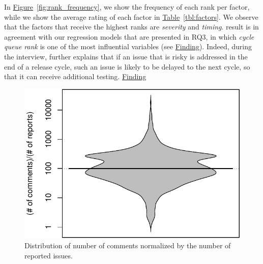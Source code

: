 \begin{sloppypar}
In \hyperref[fig:rank_frequency]{Figure}~\ref{fig:rank_frequency}, we show the
frequency of each rank per factor, while we show the average rating of each
factor in \hyperref[tbl:factors]{Table}~\ref{tbl:factors}. We observe that the
factors that receive the highest ranks are {\em severity} and {\em timing}.
\DIFdelbegin {}\DIFdelend \DIFaddbegin {}\DIFaddend result is in agreement with our regression models
that are presented in RQ3, in which {\em cycle queue rank} is one of the most
influential variables (see \DIFdelbegin %
\DIFdel{~\ref{obs:6}}\DIFdelend \DIFaddbegin \hyperref[find22]{Finding}\DIFadd{~\ref{find22}}\DIFaddend ). Indeed,
during the interview, {\em \DIFdelbegin {}\DIFdelend \DIFaddbegin {}\DIFaddend } further explains that if an issue that is risky
is addressed in the end of a release cycle, such an issue is likely to be
delayed to the next cycle, so that it can receive additional testing. \DIFaddbegin {} \hyperref[find11]{Finding}  \etal {}\DIFaddend 

\begin{figure}
	\centering
	\includegraphics[width=.8\textwidth,keepaspectratio]
	{chapters/chapter5/figures/comments_ratio.pdf}
	\caption{Distribution of number of comments normalized by the number of
	reported issues.}
	\label{fig:comments_ratio}
\end{figure}


\end{sloppypar}
